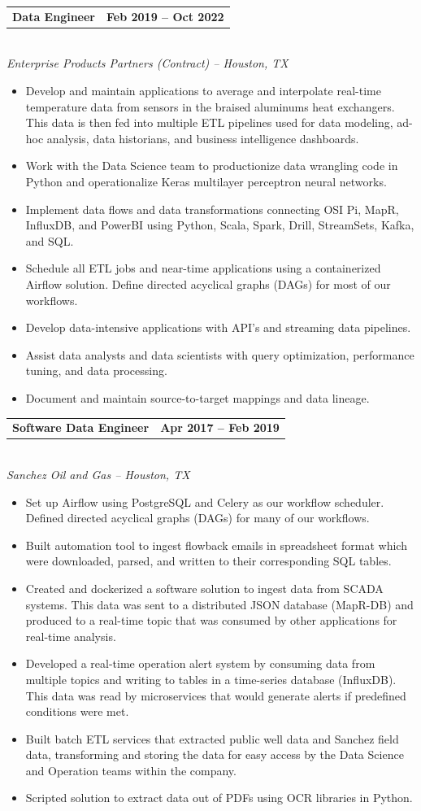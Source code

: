 \documentclass[10pt,letterpaper]{article}
\makeatletter
\newlength{\entryindent}
\newcommand{\entry}[3]{%
  \vspace{3.5pt}%
  \hspace*{\entryindent}%
  \begin{minipage}{\dimexpr\linewidth-\entryindent\relax}
    \begin{tabular*}{\linewidth}{@{}l@{\extracolsep{\fill}}r@{}}
      \textbf{#1} & \textbf{#3}
    \end{tabular*}\\
    \textit{#2}
  \end{minipage}%
  \par
}
\newenvironment{bullets}
  {\begin{itemize}[leftmargin=0.6in,labelsep=0.09in,label=\textbullet,
                   topsep=1pt,itemsep=0pt,parsep=0pt]}
  {\end{itemize}}
\makeatother
\begin{document}
\entry{Data Engineer}
      {Enterprise Products Partners (Contract) -- Houston, TX}
      {Feb 2019 -- Oct 2022}
\begin{bullets}
  \item Develop and maintain applications to average and interpolate real-time temperature data from sensors in the braised aluminums heat exchangers. This data is then fed into multiple ETL pipelines used for data modeling, ad-hoc analysis, data historians, and business intelligence dashboards.
  \item Work with the Data Science team to productionize data wrangling code in Python and operationalize Keras multilayer perceptron neural networks.
  \item Implement data flows and data transformations connecting OSI Pi, MapR, InfluxDB, and PowerBI using Python, Scala, Spark, Drill, StreamSets, Kafka, and SQL.
  \item Schedule all ETL jobs and near-time applications using a containerized Airflow solution. Define directed acyclical graphs (DAGs) for most of our workflows.
  \item Develop data-intensive applications with API's and streaming data pipelines.
  \item Assist data analysts and data scientists with query optimization, performance tuning, and data processing.
  \item Document and maintain source-to-target mappings and data lineage.
\end{bullets}

\entry{Software Data Engineer}
      {Sanchez Oil and Gas -- Houston, TX}
      {Apr 2017 -- Feb 2019}
\begin{bullets}
  \item Set up Airflow using PostgreSQL and Celery as our workflow scheduler. Defined directed acyclical graphs (DAGs) for many of our workflows.
  \item Built automation tool to ingest flowback emails in spreadsheet format which were downloaded, parsed, and written to their corresponding SQL tables.
  \item Created and dockerized a software solution to ingest data from SCADA systems. This data was sent to a distributed JSON database (MapR-DB) and produced to a real-time topic that was consumed by other applications for real-time analysis.
  \item Developed a real-time operation alert system by consuming data from multiple topics and writing to tables in a time-series database (InfluxDB). This data was read by microservices that would generate alerts if predefined conditions were met.
  \item Built batch ETL services that extracted public well data and Sanchez field data, transforming and storing the data for easy access by the Data Science and Operation teams within the company.
  \item Scripted solution to extract data out of PDFs using OCR libraries in Python.
\end{bullets}
\end{document}
